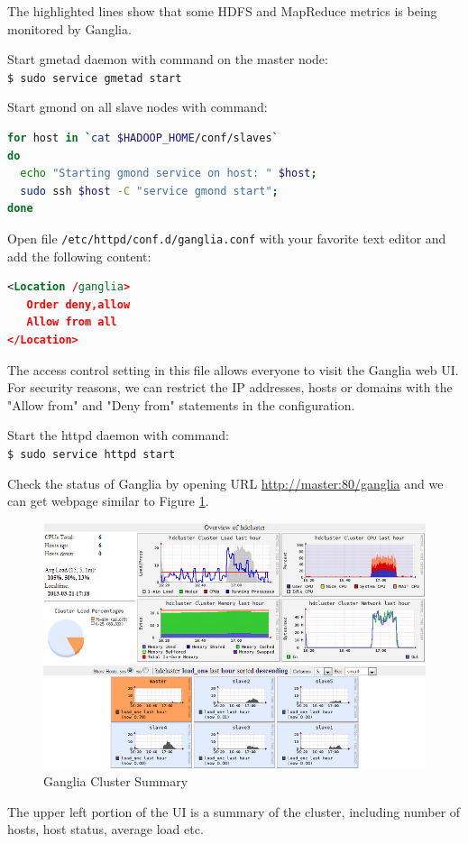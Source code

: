 The highlighted lines show that some HDFS and MapReduce metrics is being monitored by Ganglia.

Start gmetad daemon with command on the master node: \\
\verb|$ sudo service gmetad start|

Start gmond on all slave nodes with command: 
\lstset{style=bashstyle}
\begin{lstlisting}[language=bash]
for host in `cat $HADOOP_HOME/conf/slaves`
do
  echo "Starting gmond service on host: " $host;
  sudo ssh $host -C "service gmond start";
done
\end{lstlisting}

Open file \verb|/etc/httpd/conf.d/ganglia.conf| with your favorite text editor and add the following content: 
\lstset{style=bashstyle}
\begin{lstlisting}[language=XML]
<Location /ganglia>
   Order deny,allow
   Allow from all
</Location>
\end{lstlisting}

The access control setting in this file allows everyone to visit the Ganglia web UI. For security reasons, we can restrict the IP addresses, hosts or domains with the "Allow from" and "Deny from" statements in the configuration.

Start the httpd daemon with command: \\
\verb|$ sudo service httpd start|

Check the status of Ganglia by opening URL \url{http://master:80/ganglia} and we can get webpage similar to Figure \ref{fig:ganglia.cluster.summary}.
\begin{figure}[ht]
  \centering
  \includegraphics[width=.90\textwidth]{figs/5163os_06_06.png}
  \caption{Ganglia Cluster Summary}\label{fig:ganglia.cluster.summary}
\end{figure} 
The upper left portion of the UI is a summary of the cluster, including number of hosts, host status, average load etc.

